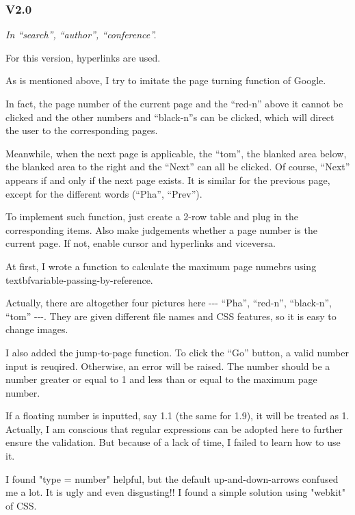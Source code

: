 \documentclass[10pt,twoside,a4paper,titlepage]{article}
\begin{document}
	\subsubsection{V2.0}
		\emph{In “search”, “author”, “conference”.}\par
		For this version, hyperlinks are used.\newline\par
		As is mentioned above, I try to imitate the page turning function of Google.\par
		In fact, the page number of the current page and the “red-n” above it cannot be clicked and the other numbers and “black-n”s can be clicked, which will direct the user to the corresponding pages.\par
		Meanwhile, when the next page is applicable, the “tom”, the blanked area below, the blanked area to the right and the “Next” can all be clicked. Of course, “Next” appears if and only if the next page exists. It is similar for the previous page, except for the different words (“Pha”, “Prev”).\par
		To implement such function, just create a 2-row table and plug in the corresponding items. Also make judgements whether a page number is the current page. If not, enable cursor and hyperlinks and viceversa.\par
		At first, I wrote a function to calculate the maximum page numebrs using textbf{variable-passing-by-reference}.\par
		Actually, there are altogether four pictures here -{}-{}- “Pha”, “red-n”, “black-n”, “tom” -{}-{}-. They are given different file names and CSS features, so it is easy to change images.\newline\par
		I also added the jump-to-page function. To click the “Go” button, a valid number input is reuqired. Otherwise, an error will be raised. The number should be a number greater or equal to 1 and less than or equal to the maximum page number.\par
		If a floating number is inputted, say 1.1 (the same for 1.9), it will be treated as 1. Actually, I am conscious that regular expressions can be adopted here to further ensure the validation. But because of a lack of time, I failed to learn how to use it.\par
		I found "type = number" helpful, but the default up-and-down-arrows confused me a lot. It is ugly and even disgusting!! I found a simple solution using "webkit" of CSS.\par
\end{document}
